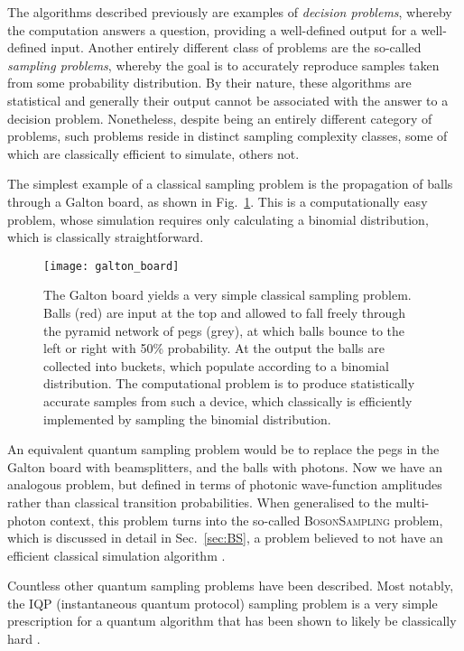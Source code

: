 The algorithms described previously are examples of \textit{decision problems}, whereby the computation answers a question, providing a well-defined output for a well-defined input. Another entirely different class of problems are the so-called \textit{sampling problems}, whereby the goal is to accurately reproduce samples taken from some probability distribution. By their nature, these algorithms are statistical and generally their output cannot be associated with the answer to a decision problem. Nonetheless, despite being an entirely different category of problems, such problems reside in distinct sampling complexity classes, some of which are classically efficient to simulate, others not.

The simplest example of a classical sampling problem is the propagation of balls through a Galton board, as shown in Fig.~\ref{fig:galton_board}. This is a computationally easy problem, whose simulation requires only calculating a binomial distribution, which is classically straightforward.

\begin{figure}[!htbp]
\texttt{[image: galton\_board]}
\captionspacefig \caption{The Galton board yields a very simple classical sampling problem. Balls (red) are input at the top and allowed to fall freely through the pyramid network of pegs (grey), at which balls bounce to the left or right with 50\% probability. At the output the balls are collected into buckets, which populate according to a binomial distribution. The computational problem is to produce statistically accurate samples from such a device, which classically is efficiently implemented by sampling the binomial distribution.}	\label{fig:galton_board}
\end{figure}

An equivalent quantum sampling problem would be to replace the pegs in the Galton board with beamsplitters, and the balls with photons. Now we have an analogous problem, but defined in terms of photonic wave-function amplitudes rather than classical transition probabilities. When generalised to the multi-photon context, this problem turns into the so-called \textsc{BosonSampling} problem, which is discussed in detail in Sec.~\ref{sec:BS}, a problem believed to not have an efficient classical simulation algorithm \cite{bib:AaronsonArkhipovBS}.

Countless other quantum sampling problems have been described. Most notably, the IQP (instantaneous quantum protocol) sampling problem is a very simple prescription for a quantum algorithm that has been shown to likely be classically hard \cite{bib:BremnerIQP}.


